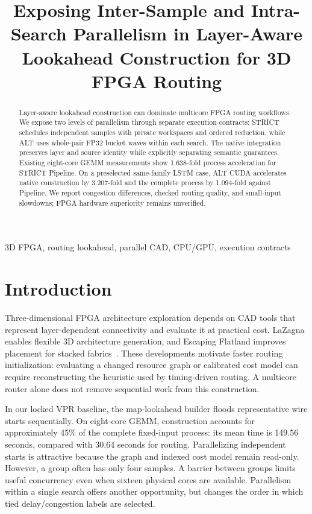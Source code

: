 \documentclass[conference,10pt,letterpaper]{IEEEtran}
\title{Exposing Inter-Sample and Intra-Search Parallelism in Layer-Aware Lookahead Construction for 3D FPGA Routing}
\author{\IEEEauthorblockN{Anonymous Authors}}
\begin{document}
\maketitle
\begin{abstract}
Layer-aware lookahead construction can dominate multicore FPGA routing workflows. We expose two levels of parallelism through separate execution contracts: STRICT schedules independent samples with private workspaces and ordered reduction, while ALT uses whole-pair FP32 bucket waves within each search. The native integration preserves layer and source identity while explicitly separating semantic guarantees. Existing eight-core GEMM measurements show 1.638-fold process acceleration for STRICT Pipeline. On a preselected same-family LSTM case, ALT CUDA accelerates native construction by 3.207-fold and the complete process by 1.094-fold against Pipeline. We report congestion differences, checked routing quality, and small-input slowdowns; FPGA hardware superiority remains unverified.
\end{abstract}
\begin{IEEEkeywords}3D FPGA, routing lookahead, parallel CAD, CPU/GPU, execution contracts\end{IEEEkeywords}
\section{Introduction}
Three-dimensional FPGA architecture exploration depends on CAD tools that represent layer-dependent connectivity and evaluate it at practical cost. LaZagna enables flexible 3D architecture generation, and Escaping Flatland improves placement for stacked fabrics~\cite{lazagna,flatland}. These developments motivate faster routing initialization: evaluating a changed resource graph or calibrated cost model can require reconstructing the heuristic used by timing-driven routing. A multicore router alone does not remove sequential work from this construction.

In our locked VPR baseline, the map-lookahead builder floods representative wire starts sequentially. On eight-core GEMM, construction accounts for approximately 45\% of the complete fixed-input process: its mean time is 149.56 seconds, compared with 30.64 seconds for routing. Parallelizing independent starts is attractive because the graph and indexed cost model remain read-only. However, a group often has only four samples. A barrier between groups limits useful concurrency even when sixteen physical cores are available. Parallelism within a single search offers another opportunity, but changes the order in which tied delay/congestion labels are selected.
\end{document}

